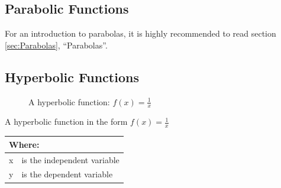 \subsection{Parabolic Functions}
\label{sec:ParabolicFunctions}
For an introduction to parabolas, it is highly recommended to read section
\ref{sec:Parabolas}, ``Parabolas''.
\clearpage
\subsection{Hyperbolic Functions}
\begin{figure}[!htb]
\label{fig:FuncGraphHyperbola}
\caption{A hyperbolic function: $f(x) = \frac{1}{x}$}
\end{figure}
A hyperbolic function in the form $ f(x) = \frac{1}{x}$
\begin{table}[!hbt]
\label{tab:PartsOfAHyperbolicFunction}
\begin{tabularx}{\linewidth}{| l X |}
  \hline
  \multicolumn{2}{|l|}{Where:} \\
  \hline \hline
  x & is the independent variable\\
  y & is the dependent variable\\
\hline
\end{tabularx}
\end{table}
%
\clearpage
